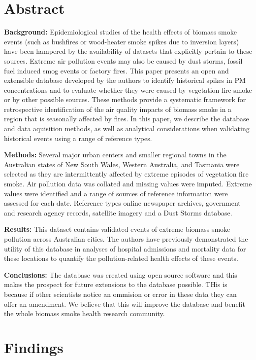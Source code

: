 
\section{Abstract}\label{abstract}

\textbf{Background:} Epidemiological studies of the health effects of
biomass smoke events (such as bushfires or wood-heater smoke spikes due
to inversion layers) have been hampered by the availability of datasets
that explicitly pertain to these sources. Extreme air pollution events
may also be caused by dust storms, fossil fuel induced smog events or
factory fires. This paper presents an open and extensible database
developed by the authors to identify historical spikes in PM
concentrations and to evaluate whether they were caused by vegetation
fire smoke or by other possible sources. These methods provide a
systematic framework for retrospective identification of the air quality
impacts of biomass smoke in a region that is seasonally affected by
fires. In this paper, we describe the database and data aquisition
methods, as well as analytical considerations when validating historical
events using a range of reference types.

\textbf{Methods:} Several major urban centers and smaller regional towns
in the Australian states of New South Wales, Western Australia, and
Tasmania were selected as they are intermittently affected by extreme
episodes of vegetation fire smoke. Air pollution data was collated and
missing values were imputed. Extreme values were identified and a range
of sources of reference information were assessed for each date.
Reference types online newspaper archives, government and research
agency records, satellite imagery and a Dust Storms database.

\textbf{Results:} This dataset contains validated events of extreme
biomass smoke pollution across Australian cities. The authors have
previously demonstrated the utility of this database in analyses of
hospital admissions and mortality data for these locations to quantify
the pollution-related health effects of these events.

\textbf{Conclusions:} The database was created using open source
software and this makes the prospect for future extensions to the
database possible. THis is because if other scientists notice an
ommision or error in these data they can offer an amendment. We believe
that this will improve the database and benefit the whole biomass smoke
health research community.

\section{Findings}\label{findings}

